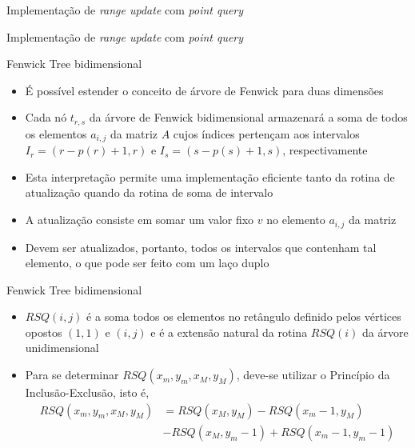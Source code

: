 \begin{frame}[fragile]{Implementação de \textit{range update} com \textit{point query}}
\end{frame}

\begin{frame}[fragile]{Implementação de \textit{range update} com \textit{point query}}
\end{frame}

\begin{frame}[fragile]{Fenwick Tree bidimensional}

    \begin{itemize}
        \item É possível estender o conceito de árvore de Fenwick para duas dimensões

        \item Cada nó $t_{r,s}$ da árvore de Fenwick bidimensional armazenará a soma de todos
            os elementos $a_{i,j}$ da matriz $A$ cujos índices pertençam aos intervalos
            $I_r = (r - p(r) + 1, r)$ e $I_s = (s - p(s) + 1, s)$, respectivamente

        \item Esta interpretação permite uma implementação eficiente tanto da rotina de 
            atualização quando da rotina de soma de intervalo

        \item A atualização consiste em somar um valor fixo $v$ no elemento $a_{i,j}$ da matriz

        \item Devem ser atualizados, portanto, todos os intervalos que contenham tal elemento,
            o que pode ser feito com um laço duplo
    \end{itemize}

\end{frame}

\begin{frame}[fragile]{Fenwick Tree bidimensional}

    \begin{itemize}
        \item $RSQ(i, j)$ é a soma todos os elementos no retângulo definido pelos vértices
            opostos $(1, 1)$ e $(i, j)$ e é a extensão natural da rotina $RSQ(i)$ da árvore
            unidimensional

        \item Para se determinar $RSQ(x_m, y_m, x_M, y_M)$, deve-se utilizar o Princípio da
            Inclusão-Exclusão, isto é,
        \begin{align*}
            RSQ(x_m, y_m, x_M, y_M) &= RSQ(x_M, y_M) - RSQ(x_m - 1, y_M) \\
                &- RSQ(x_M, y_m - 1) + RSQ(x_m - 1, y_m - 1)
        \end{align*}
    \end{itemize}
\end{frame}

